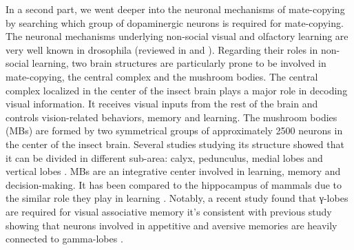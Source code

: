 \documentclass[a4paper, 12pt]{article}
\begin{document}
In a second part, we went deeper into the neuronal mechanisms of mate-copying by searching which group of dopaminergic neurons is required for mate-copying. The neuronal mechanisms underlying non-social visual and olfactory learning are very well known in drosophila (reviewed in \textcite{ guo_vision_2017} and \textcite{cognigni_right_2018}). Regarding their roles in non-social learning, two brain structures are particularly prone to be involved in mate-copying, the central complex and the mushroom bodies. The central complex localized in the center of the insect brain plays a major role in decoding visual information. It receives visual inputs from the rest of the brain and controls vision-related behaviors, memory and learning. The mushroom bodies (MBs) are formed by two symmetrical groups of approximately 2500 neurons in the center of the insect brain. Several studies studying its structure showed that it can be divided in different sub-area: calyx, pedunculus, medial lobes and vertical lobes \parencite{aso_neuronal_2016}. MBs are an integrative center involved in learning, memory and decision-making. It has been compared to the hippocampus of mammals due to the similar role they play in learning \parencite{strausfeld_evolution_1998}.	Notably, a recent study found that γ-lobes are required for visual associative memory \parencite{ vogt_shared_2014} it's consistent with previous study showing that neurons involved in appetitive and aversive memories are heavily connected to gamma-lobes \parencite{cladrige-chang_writing_2009, burke_ layered_2012}.
	
\end{document}
